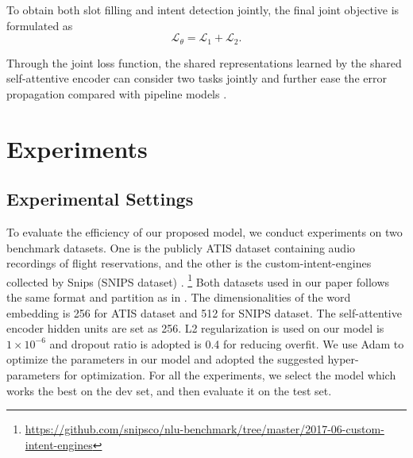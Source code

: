 \documentclass[11pt,a4paper]{article}
\begin{document}
To obtain both slot filling and intent detection jointly, 
the final joint objective is formulated as
\begin{equation}
\mathcal { L } _ { \theta } = \mathcal{ L }_{1} + \mathcal{ L }_{2}.
\end{equation}

Through the joint loss function, the shared 
representations learned by the shared self-attentive encoder can 
consider two tasks jointly and further ease the error propagation compared with pipeline models \cite{zhang2016joint}. 

\section{Experiments}
\subsection{Experimental Settings}
To evaluate the efficiency of our proposed model, we 
conduct experiments on two benchmark datasets. One
is the publicly ATIS dataset \cite{hemphill1990atis} 
containing audio recordings of flight reservations, and the other is the custom-intent-engines
collected by Snips (SNIPS dataset) \cite{coucke2018snips}.
\footnote{\url{https://github.com/snipsco/nlu-benchmark/tree/master/2017-06-custom-intent-engines}}
Both datasets used in 
our paper follows the same format and partition as in . 
The dimensionalities of the word embedding is 256 for ATIS dataset and 512 for SNIPS dataset. The self-attentive encoder
hidden units are set as 256. L2 regularization is used 
on our model is $1\times 10^{-6}$ and dropout ratio
is adopted is 0.4 for reducing overfit.
We use Adam \cite{kingma-ba:2014:ICLR} to 
optimize the parameters in our model and adopted 
the suggested hyper-parameters for optimization. 
For all the experiments, we select the model which works the best on the dev set, and then evaluate it on the test set.
\end{document}
